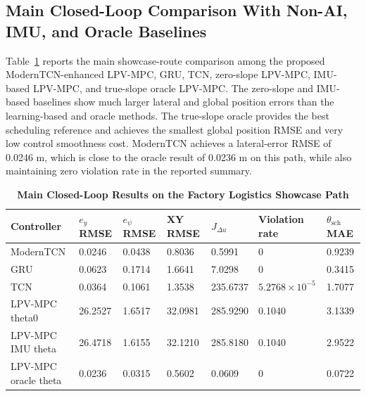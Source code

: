 \documentclass[twocolumn]{article}
\begin{document}
\label{sec:results}

\subsection{Main Closed-Loop Comparison With Non-AI, IMU, and Oracle Baselines}

Table~\ref{tab:main_closed_loop} reports the main showcase-route comparison among the proposed ModernTCN-enhanced LPV-MPC, GRU, TCN, zero-slope LPV-MPC, IMU-based LPV-MPC, and true-slope oracle LPV-MPC. The zero-slope and IMU-based baselines show much larger lateral and global position errors than the learning-based and oracle methods. The true-slope oracle provides the best scheduling reference and achieves the smallest global position RMSE and very low control smoothness cost. ModernTCN achieves a lateral-error RMSE of 0.0246 m, which is close to the oracle result of 0.0236 m on this path, while also maintaining zero violation rate in the reported summary.

\begin{table}[!t]

\caption{\textbf{Main Closed-Loop Results on the Factory Logistics Showcase Path}}

\label{tab:main_closed_loop}

\setlength{\tabcolsep}{4pt}

\begin{tabular}{|p{105pt}|p{48pt}|p{48pt}|p{48pt}|p{55pt}|p{48pt}|p{58pt}|}

\hline

Controller & $e_y$ RMSE & $e_{\psi}$ RMSE & XY RMSE & $J_{\Delta u}$ & Violation rate & $\theta_{\mathrm{sch}}$ MAE \\

\hline

ModernTCN & 0.0246 & 0.0438 & 0.8036 & 0.5991 & 0 & 0.9239 \\

GRU & 0.0623 & 0.1714 & 1.6641 & 7.0298 & 0 & 0.3415 \\

TCN & 0.0364 & 0.1061 & 1.3538 & 235.6737 & $5.2768\times10^{-5}$ & 1.7077 \\

LPV-MPC theta0 & 26.2527 & 1.6517 & 32.0981 & 285.9290 & 0.1040 & 3.1339 \\

LPV-MPC IMU theta & 26.4718 & 1.6155 & 32.1210 & 285.8180 & 0.1040 & 2.9522 \\

LPV-MPC oracle theta & 0.0236 & 0.0315 & 0.5602 & 0.0609 & 0 & 0.0722 \\

\hline

\end{tabular}

\end{table}
\end{document}
